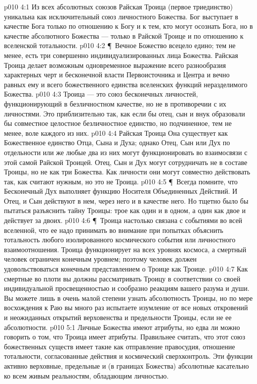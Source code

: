 \vs p010 4:1 Из всех абсолютных союзов Райская Троица (первое триединство) уникальна как исключительный союз личностного Божества. Бог выступает в качестве Бога только по отношению к Богу и к тем, кто могут осознать Бога, но в качестве абсолютного Божества --- только в Райской Троице и по отношению к вселенской тотальности.
\vs p010 4:2 \P\ Вечное Божество всецело едино; тем не менее, есть три совершенно индивидуализированных лица Божества. Райская Троица делает возможным одновременное выражение всего разнообразия характерных черт и бесконечной власти Первоисточника и Центра и вечно равных ему и всего божественного единства вселенских функций неразделимого Божества.
\vs p010 4:3 Троица --- это союз бесконечных личностей, функционирующий в безличностном качестве, но не в противоречии с их личностями. Это приблизительно так, как если бы отец, сын и внук образовали бы совместное целостное безличностное единство, но подчиненное, тем не менее, воле каждого из них.
\vs p010 4:4 Райская Троица  Она существует как Божественное единство Отца, Сына и Духа; однако Отец, Сын или Дух по отдельности или же любые два из них могут функционировать во взаимосвязи с этой самой Райской Троицей. Отец, Сын и Дух могут сотрудничать не в составе Троицы, но не как три Божества. Как личности они могут совместно действовать так, как считают нужным, но это не Троица.
\vs p010 4:5 \P\ Всегда помните, что Бесконечный Дух выполняет функцию Носителя Объединенных Действий. И Отец, и Сын действуют в нем, через него и в качестве него. Но тщетно было бы пытаться разъяснить тайну Троицы: трое как один и в одном, а один как двое и действует за двоих.
\vs p010 4:6 \P\ Троица настолько связана с событиями во всей вселенной, что ее надо принимать во внимание при попытках объяснить тотальность любого изолированного космического события или личностного взаимоотношения. Троица функционирует на всех уровнях космоса, а смертный человек ограничен конечным уровнем; поэтому человек должен удовольствоваться конечным представлением о Троице как Троице.
\vs p010 4:7 Как смертные во плоти вы должны рассматривать Троицу в соответствии со своей индивидуальной просвещенностью и сообразно реакциям вашего разума и души. Вы можете лишь в очень малой степени узнать абсолютность Троицы, но по мере восхождения к Раю вы много раз испытаете изумление от все новых откровений и неожиданных открытий верховенства и предельности Троицы, если не ее абсолютности.
\vs p010 5:1 Личные Божества имеют атрибуты, но едва ли можно говорить о том, что Троица имеет атрибуты. Правильнее считать, что этот союз божественных существ имеет такие  как отправление правосудия, отношение тотальности, согласованные действия и космический сверхконтроль. Эти функции активно верховные, предельные и (в границах Божества) абсолютные касательно ко всем живым реальностям, обладающим личностью.

